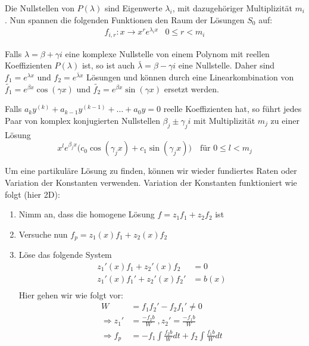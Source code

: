 \documentclass[a4paper,10pt]{article}
\begin{document}
Die Nullstellen von \(P(\lambda)\) sind Eigenwerte \(\lambda_i\), mit dazugehöriger Multiplizität \(m_i\). Nun spannen die folgenden Funktionen den Raum der Lösungen \(S_0\) auf:
\begin{align*}
  & f_{i,r} : x \to x^r e^{\lambda_i x} & 0 \leq r < m_i &
\end{align*}

Falls \(\lambda = \beta + \gamma i\) eine komplexe Nullstelle von einem Polynom mit reellen Koeffizienten \(P(\lambda)\) ist, so ist auch 
\(\bar{\lambda} = \beta - \gamma i\) eine Nullstelle. Daher sind \(f_1 = e^{\lambda x}\) und \(f_2 = e^{\bar{\lambda} x}\) Lösungen und können durch eine Linearkombination von \(\tilde{f_1} = e^{\beta x} \cos(\gamma x)\) und \(\tilde{f_2} = e^{\beta x} \sin(\gamma x)\) ersetzt werden.

Falls \(a_k y^{(k)} + a_{k-1}y^{(k-1)} + \dots + a_0 y = 0\) reelle Koeffizienten hat, so führt jedes Paar von komplex konjugierten Nullstellen $\beta_j \pm \gamma_j i$ mit Multiplizität $m_j$ zu einer Lösung
\[x^l e^{\beta_j x} \Big( c_0 \cos(\gamma_j x) + c_1 \sin(\gamma_j x) \Big) \quad \text{für }0 \leq l < m_j\]

Um eine partikuläre Lösung zu finden, können wir wieder fundiertes Raten oder Variation der Konstanten verwenden. 
Variation der Konstanten funktioniert wie folgt (hier 2D):

\begin{enumerate}[label=(\arabic*)]
  \item Nimm an, dass die homogene Lösung \(f = z_1 f_1 + z_2 f_2\) ist
  \item Versuche nun \(f_p = z_1(x) f_1 + z_2(x) f_2\)
  \item Löse das folgende System
  \begin{align*}
    z_1'(x) f_1 + z_2'(x) f_2 &= 0\\
    z_1'(x) f_1' + z_2'(x) f_2' &= b(x)\\
  \end{align*}
  Hier gehen wir wie folgt vor:
  \begin{align*}
    W &= f_1 f_2' - f_2 f_1' \neq 0\\
    \Rightarrow z_1' &= \frac{-f_2 b}{W} \; , z_2' = \frac{-f_1 b}{W}\\
    \Rightarrow f_p &= -f_1 \int \frac{f_2 b}{W} dt + f_2 \int \frac{f_1 b}{W} dt
  \end{align*}
\end{enumerate}
\end{document}
